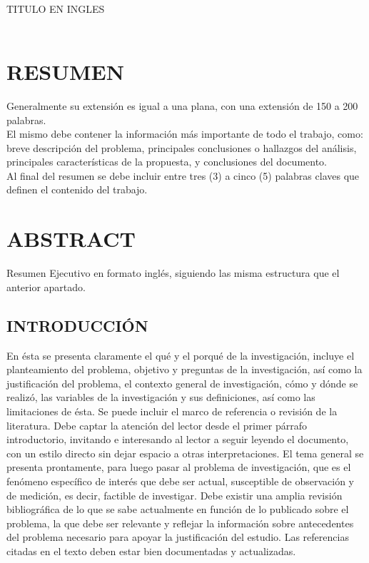 \documentclass[12pt,letterpaper]{report}
\begin{document}
	\caratulaTapa
	\caratulaContenido
	\newpage
	\clearpage
	\pagestyle{empty}
	
	{
	\begin{center}
	{\fontsize{14}{16}\selectfont \MakeUppercase{\Titulo}}\\
	
	\vspace{0.3cm}
	{\fontsize{14}{16}\selectfont \MakeUppercase{Titulo en Ingles}}\\
	
	{\fontsize{12}{14}\selectfont \MakeUppercase{\Autor}}\\
	\end{center}
	\section*{RESUMEN}
	Generalmente su extensión es igual a una plana, con una extensión de 150 a 200 palabras.\\
	El mismo debe contener la información más importante de todo el trabajo, como:
	breve descripción del problema, principales conclusiones o hallazgos del análisis,
	principales características de la propuesta, y conclusiones del documento.\\
	Al final del resumen se debe incluir entre tres (3) a cinco (5) palabras claves que
	definen el contenido del trabajo.
	
	\section*{ABSTRACT}
	Resumen Ejecutivo en formato inglés, siguiendo las misma estructura que el anterior apartado.
	
	\begin{multicols}{2}
	\section*{INTRODUCCIÓN}
	En ésta se presenta claramente el qué y el porqué de la investigación, incluye el planteamiento del problema, objetivo y preguntas de
la investigación, así como la justificación del
problema, el contexto general de investigación,
cómo y dónde se realizó, las variables de la investigación y sus definiciones, así como las limitaciones de ésta. Se puede incluir el marco
de referencia o revisión de la literatura.
Debe captar la atención del lector desde el
primer párrafo introductorio, invitando e interesando al lector a seguir leyendo el documento, con un estilo directo sin dejar espacio
a otras interpretaciones.
El tema general se presenta prontamente,
para luego pasar al problema de investigación,
que es el fenómeno específico de interés que
debe ser actual, susceptible de observación y
de medición, es decir, factible de investigar.
Debe existir una amplia revisión bibliográfica de lo que se sabe actualmente en función
de lo publicado sobre el problema, la que debe
ser relevante y reflejar la información sobre
antecedentes del problema necesario para
apoyar la justificación del estudio. Las referencias citadas en el texto deben estar bien
documentadas y actualizadas.

\end{multicols}}
\end{document}
